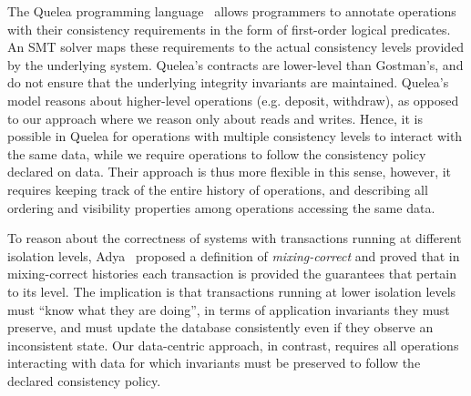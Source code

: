 \documentclass[numbers]{sigplanconf}
\begin{document}
The Quelea programming language~\cite{sivaramakrishnan2015declarative} allows
programmers to annotate operations with their consistency requirements
in the form of first-order logical predicates.
An SMT solver maps these requirements to the actual
consistency levels provided by the underlying system. Quelea's contracts are
lower-level than Gostman's, and do not ensure that the underlying integrity
invariants are maintained. Quelea's model reasons about higher-level
operations (e.g. deposit, withdraw), as opposed to our approach where we reason 
only about reads and writes. Hence, it is possible in Quelea for operations with
multiple consistency levels to interact with the same data, while we require 
operations to follow the consistency policy declared on data. Their 
approach is thus more flexible in this sense, however, it requires keeping track of the entire
history of operations, and describing all ordering and visibility properties among 
operations accessing the same data.

To reason about the correctness of systems with transactions running at different
isolation levels, Adya~\cite{adya2000generalized} proposed a definition of
\emph{mixing-correct} and proved that 
in mixing-correct histories each transaction is provided 
the guarantees that pertain to its level. The implication is that transactions running 
at lower isolation levels must ``know what they are doing'', in terms of application 
invariants they must preserve, and must update the database consistently even if they observe an
inconsistent state. Our data-centric approach, in contrast, requires all operations interacting with data
for which invariants must be preserved to follow the declared consistency
policy. 
\end{document}

